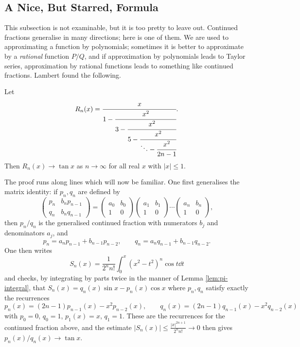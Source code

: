 \documentclass[a4paper]{scrartcl}
\begin{document}
\subsection*{A Nice, But Starred, Formula}

This subsection is not examinable, but it is too pretty to leave out. Continued fractions generalise in many directions; here is one of them. We are used to approximating a function by polynomials; sometimes it is better to approximate by a \emph{rational} function $P/Q$, and if approximation by polynomials leads to Taylor series, approximation by rational functions leads to something like continued fractions. Lambert found the following.

\begin{theorem}[Lambert]\label{thm:lambert}
	Let
	$$R_n(x) = \cfrac{x}{1-\cfrac{x^2}{3-\cfrac{x^2}{5-\cfrac{x^2}{\ddots-\cfrac{x^2}{2n-1}}}}}.$$
	Then $R_n(x)\to\tan x$ as $n\to\infty$ for all real $x$ with $|x|\leq1$.
\end{theorem}

The proof runs along lines which will now be familiar. One first generalises the matrix identity: if $p_n,q_n$ are defined by
$$\begin{pmatrix}p_n&b_np_{n-1}\\q_n&b_nq_{n-1}\end{pmatrix} = \begin{pmatrix}a_0&b_0\\1&0\end{pmatrix}\begin{pmatrix}a_1&b_1\\1&0\end{pmatrix}\cdots\begin{pmatrix}a_n&b_n\\1&0\end{pmatrix},$$
then $p_n/q_n$ is the generalised continued fraction with numerators $b_j$ and denominators $a_j$, and
$$p_n = a_np_{n-1}+b_{n-1}p_{n-2}, \qquad q_n = a_nq_{n-1}+b_{n-1}q_{n-2}.$$
One then writes
$$S_n(x) = \frac{1}{2^nn!}\int_0^x(x^2-t^2)^n\cos t\dd t$$
and checks, by integrating by parts twice in the manner of Lemma \ref{lem:pi-integral}, that $S_n(x) = q_n(x)\sin x - p_n(x)\cos x$ where $p_n,q_n$ satisfy exactly the recurrences
$$p_n(x) = (2n-1)p_{n-1}(x)-x^2p_{n-2}(x),\qquad q_n(x) = (2n-1)q_{n-1}(x)-x^2q_{n-2}(x)$$
with $p_0=0$, $q_0=1$, $p_1(x)=x$, $q_1=1$. These are the recurrences for the continued fraction above, and the estimate $|S_n(x)|\leq\frac{|x|^{2n+1}}{2^nn!}\to0$ then gives $p_n(x)/q_n(x)\to\tan x$.
\end{document}

